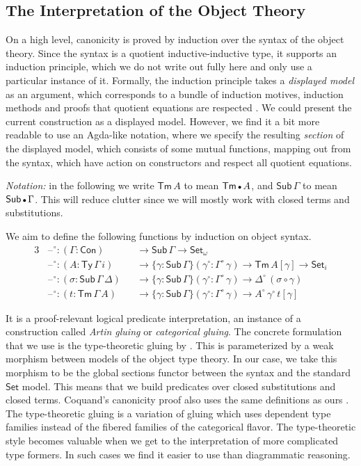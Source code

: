 \documentclass[acmsmall,screen,review]{acmart}
\newcommand{\msf}[1]{{\mathsf{#1}}}
\newcommand{\Set}{\msf{Set}}
\newcommand{\blank}{{\mathord{\hspace{1pt}\text{--}\hspace{1pt}}}}
\newcommand{\emptycon}{\scaleobj{.75}\bullet}
\newcommand{\Con}{\msf{Con}}
\newcommand{\Sub}{\msf{Sub}}
\newcommand{\Ty}{\msf{Ty}}
\newcommand{\Tm}{\msf{Tm}}
\newcommand{\w}{\circ}
\begin{document}
\subsection{The Interpretation of the Object Theory}\label{sec:canonicity-model}

On a high level, canonicity is proved by induction over the syntax of the object theory. Since the
syntax is a quotient inductive-inductive type, it supports an induction principle, which we do not
write out fully here and only use a particular instance of it. Formally, the induction principle
takes a \emph{displayed model} as an argument, which corresponds to a bundle of induction motives,
induction methods and proofs that quotient equations are respected
\cite[Chapter~4]{DBLP:journals/corr/abs-2302-08837}. We could present the current construction as a
displayed model. However, we find it a bit more readable to use an Agda-like notation, where we
specify the resulting \emph{section} of the displayed model, which consists of some mutual
functions, mapping out from the syntax, which have action on constructors and respect all quotient
equations.

\emph{Notation:} in the following we write $\Tm\,A$ to mean $\Tm\,\emptycon\,A$, and
$\Sub\,\Gamma$ to mean $\Sub\,\emptycon\,\Gamma$. This will reduce clutter since we will mostly work
with closed terms and substitutions.

We aim to define the following functions by induction on object syntax.
\begin{alignat*}{3}
  &\blank^\w : (\Gamma : \Con)      && \to \Sub\,\Gamma \to \Set_\omega\\
  &\blank^\w : (A : \Ty\,\Gamma\,i) && \to \{\gamma : \Sub\,\Gamma\}(\gamma^\w : \Gamma^\w\,\gamma) \to \Tm\,A[\gamma] \to \Set_i\\
  &\blank^\w : (\sigma : \Sub\,\Gamma\,\Delta) && \to \{\gamma : \Sub\,\Gamma\}(\gamma^\w : \Gamma^\w\,\gamma) \to \Delta^\w\,(\sigma \circ \gamma)\\
  &\blank^\w : (t : \Tm\,\Gamma\,A) && \to \{\gamma : \Sub\,\Gamma\}(\gamma^\w : \Gamma^\w\,\gamma) \to A^\w\,\gamma^\w\,t[\gamma]
\end{alignat*}

It is a proof-relevant logical predicate interpretation, an instance of a construction called
\emph{Artin gluing} \cite[Exposé~4,~Section~9.5]{SGA4} or \emph{categorical gluing}. The concrete
formulation that we use is the type-theoretic gluing by \citet{gluing}. This is parameterized by a
weak morphism between models of the object type theory. In our case, we take this morphism to be the
global sections functor between the syntax and the standard $\Set$ model. This means that we build
predicates over closed substitutions and closed terms. Coquand's canonicity proof also uses the same
definitions as ours \cite{coquand2018canonicity}. The type-theoretic gluing is a variation of gluing
which uses dependent type families instead of the fibered families of the categorical flavor. The
type-theoretic style becomes valuable when we get to the interpretation of more complicated type
formers. In such cases we find it easier to use than diagrammatic reasoning.
\end{document}
